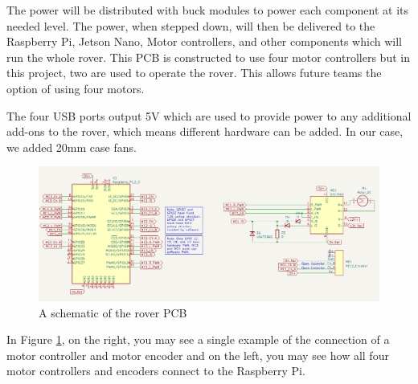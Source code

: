 \documentclass[a4paper, 10pt]{article}
\begin{document}
		The power will be distributed with buck modules to power each component at its needed level. The power, when stepped down, will then be delivered to the Raspberry Pi, Jetson Nano, Motor controllers, and other components which will run the whole rover. This PCB is constructed to use four motor controllers but in this project, two are used to operate the rover. This allows future teams the option of using four motors.
		
		The four USB ports output 5V which are used to provide power to any additional add-ons to the rover, which means different hardware can be added. In our case, we added 20mm case fans. 
		
		\begin{figure} [!h]
			\centering
			\includegraphics[scale=0.9]{Photos/Rover schematic 2}
			\caption{A schematic of the rover PCB}
			\label{rover_PCB_2}
		\end{figure}
		
		In Figure \ref{rover_PCB_2}, on the right, you may see a single example of the connection of a motor controller and motor encoder and on the left, you may see how all four motor controllers and encoders connect to the Raspberry Pi.
		
\clearpage
		
\end{document}
